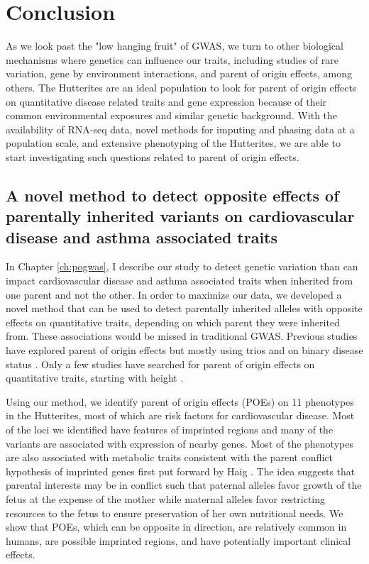 \chapter{Conclusion}

As we look past the "low hanging fruit" of GWAS, we turn to other biological mechanisms where genetics can influence our traits, including studies of rare variation\citep{Igartua:2017ir,Li:2017bq}, gene by environment interactions, and parent of origin effects, among others. The Hutterites are an ideal population to look for parent of origin effects on quantitative disease related traits and gene expression because of their common environmental exposures and similar genetic background\cite{Weiss:2005cq,Abney2001,Ober:2001dy}. With the availability of RNA-seq data, novel methods for imputing and phasing data at a population scale\citep {Livne2015}, and extensive phenotyping of the Hutterites, we are able to start investigating such questions related to parent of origin effects. 



\section{A novel method to detect opposite effects of parentally inherited variants on cardiovascular disease and asthma associated traits}
 
 In Chapter \ref{ch:pogwas}, I describe our study to detect genetic variation than can impact cardiovascular disease and asthma associated traits when inherited from one parent and not the other. In order to maximize our data, we developed a novel method that can be used to detect parentally inherited alleles with opposite effects on quantitative traits, depending on which parent they were inherited from. These associations would be missed in traditional GWAS. Previous studies have explored parent of origin effects but mostly using trios \cite{Garg2012a,Ainsworth:2010bp,Howey:2012hj} and on binary disease status \cite{Kong:2009kk,Ainsworth:2010bp}. Only a few studies have searched for parent of origin effects on quantitative traits, starting with height \cite{Benonisdottir:2016dz,Zoledziewska:2015do}.
 
Using our method, we identify parent of origin effects (POEs) on 11 phenotypes in the Hutterites, most of which are risk factors for cardiovascular disease. Most of the loci we identified have features of imprinted regions and many of the variants are associated with expression of nearby genes. Most of the phenotypes are also associated with metabolic traits consistent with the parent conflict hypothesis of imprinted genes first put forward by Haig \citep{Haig:2000if,Barlow:2014dv,Patten:2016cb}. The idea suggests that parental interests may be in conflict such that paternal alleles favor growth of the fetus at the expense of the mother while maternal alleles favor restricting resources to the fetus to ensure preservation of her own nutritional needs. We show that POEs, which can be opposite in direction, are relatively common in humans, are possible imprinted regions, and have potentially important clinical effects. 
 
